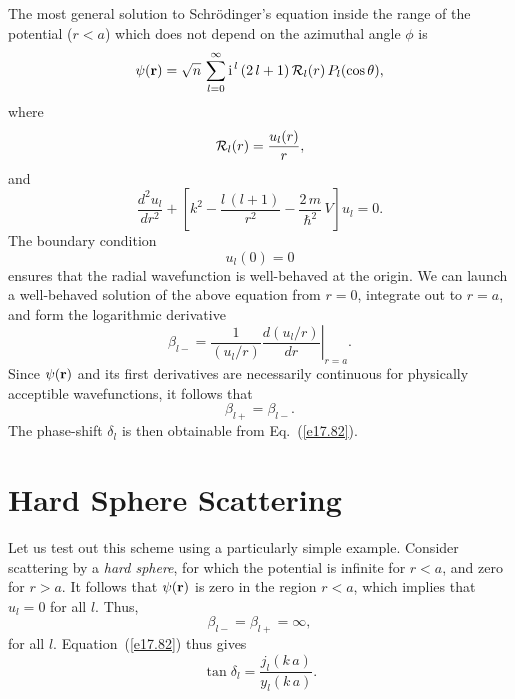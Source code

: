 The most general solution to Schr\"{o}dinger's equation inside 
the range of the potential ($r<a$) which does not depend on the
azimuthal angle $\phi$ is
\begin{equation}
\psi({\bf r}) = \sqrt{n}\,\sum_{l=0}^\infty
{\rm i}^{\,l} \,(2\,l+1)\,{\cal R}_l(r)\,P_l(\cos\theta),
\end{equation}
where
\begin{equation}
{\cal R}_l (r) = \frac{u_l(r)}{r},
\end{equation}
and
\begin{equation}\label{e17.85}
\frac{d^2 u_l}{d r^2} +\left[k^2  -\frac{l\,(l+1)}{r^2} -\frac{2\,m}{\hbar^2} \,V\right] u_l = 0.
\end{equation}
The boundary condition 
\begin{equation}\label{e17.86}
u_l(0) = 0
\end{equation}
 ensures that the radial wavefunction is well-behaved at the
origin. 
We can launch a well-behaved solution of the above equation from 
$r=0$, integrate out to $r=a$, and form the logarithmic derivative
\begin{equation}
\beta_{l-} = \left.\frac{1}{(u_l/r)} \frac{d(u_l/r)}{dr}\right|_{r=a}.
\end{equation}
Since $\psi({\bf r})$ and its first derivatives are necessarily continuous for
physically acceptible wavefunctions, it follows that
\begin{equation}
\beta_{l+} = \beta_{l-}.
\end{equation}
The phase-shift $\delta_l$ is then obtainable from Eq.~(\ref{e17.82}).

\section{Hard Sphere Scattering}
Let us test out this scheme using a particularly simple example. Consider
scattering by a {\em hard sphere}, for which  the potential is infinite 
for $r<a$, and zero for $r>a$. It follows that $\psi({\bf r})$ is
zero in the region $r<a$, which implies that  $u_l =0$ for all $l$. 
Thus,
\begin{equation}
\beta_{l-} = \beta_{l+} = \infty,
\end{equation}
for all $l$. Equation~(\ref{e17.82}) thus gives
\begin{equation}\label{e17.90}
\tan \delta_l = \frac{j_l(k\,a)}{y_l(k\,a)}.
\end{equation}

